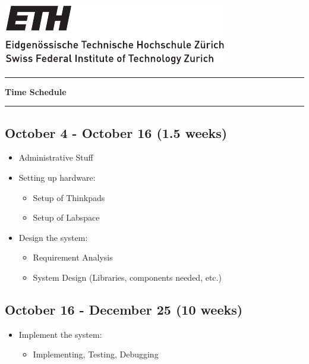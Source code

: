 \documentclass[a4paper, 11pt]{article}
\begin{document}
\includegraphics[scale=1]{ETHlogo_13.pdf}
\vspace{10pt}
\hrule
\vspace{10pt}

\begin{center}
    {\LARGE
    \textbf{\Huge{Time Schedule}}}
\end{center}

\vspace{10pt}
\hrule

\subsection*{October 4 - October 16 (1.5 weeks)}
\begin{itemize}
    \item Administrative Stuff
    \item Setting up hardware: \begin{itemize}
                                \item Setup of Thinkpads
                                \item Setup of Labspace
                               \end{itemize}
    \item Design the system: \begin{itemize}
                                \item Requirement Analysis
                                \item System Design (Libraries, components needed, etc.)
                             \end{itemize}
\end{itemize}

\subsection*{October 16 - December 25 (10 weeks)}
\begin{itemize}
    \item Implement the system: \begin{itemize}
                                \item Implementing, Testing, Debugging
                               \end{itemize}

\end{itemize}
\end{document}
